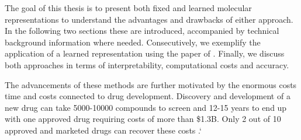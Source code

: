 The goal of this thesis is to present both fixed and learned molecular representations to understand the advantages and drawbacks of either approach. In the following two sections these are introduced, accompanied by technical background information where needed. Consecutively, we exemplify the application of a learned representation using the paper of \cite{STOKES2020688}. Finally, we discuss both approaches in terms of interpretability, computational costs and accuracy.  



The advancements of these methods are further motivated by the enormous costs time and costs connected to drug development. Discovery and development of a new drug can take 5000-10000 compounds to screen and 12-15 years to end up with one approved drug requiring costs of more than \$1.3B. Only 2 out of 10 approved and marketed drugs can recover these costs \cite{hecht}.`

